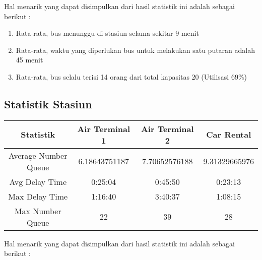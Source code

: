 \documentclass{article}
\begin{document}
Hal menarik yang dapat disimpulkan dari hasil statistik ini adalah sebagai berikut :

\begin{enumerate}
	\item Rata-rata, bus menunggu di stasiun selama sekitar 9 menit
	\item Rata-rata, waktu yang diperlukan bus untuk melakukan satu putaran adalah 45 menit
	\item Rata-rata, bus selalu terisi 14 orang dari total kapasitas 20 (Utilisasi 69\%)
\end{enumerate}  

\pagebreak
\subsection{Statistik Stasiun}

\begin{center}
 \begin{tabular}{||c | c | c | c||} 
 \hline
 Statistik & Air Terminal 1 & Air Terminal 2 & Car Rental \\ [0.5ex] 
 \hline\hline
 Average Number Queue & 6.18643751187 & 7.70652576188 & 9.31329665976 \\ 
 \hline
 Avg Delay Time & 0:25:04 & 0:45:50 & 0:23:13 \\
 \hline
 Max Delay Time & 1:16:40 & 3:40:37 & 1:08:15 \\
 \hline
 Max Number Queue & 22 & 39 & 28 \\
 \hline
\end{tabular}
\end{center}


Hal menarik yang dapat disimpulkan dari hasil statistik ini adalah sebagai berikut :
\end{document}
